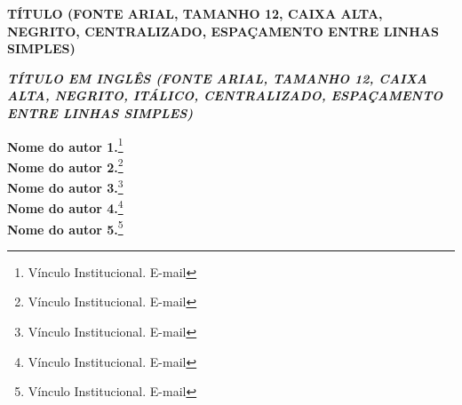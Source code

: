 \documentclass[12pt, a4paper]{article}
\begin{document}
\thispagestyle{firstpage} %
\vspace*{0.2cm}
\begin{center}
    \singlespacing
    \textbf{TÍTULO (FONTE ARIAL, TAMANHO 12, CAIXA ALTA, NEGRITO, CENTRALIZADO, ESPAÇAMENTO ENTRE LINHAS SIMPLES)}
\end{center}\vspace{-2.em}
\begin{center}
    \singlespacing
    \textit{\textbf{TÍTULO EM INGLÊS (FONTE ARIAL, TAMANHO 12, CAIXA ALTA, NEGRITO, ITÁLICO, CENTRALIZADO, ESPAÇAMENTO ENTRE LINHAS SIMPLES)}}
\end{center}\vspace{-2.em}
\begin{flushright}
    \singlespacing
    \textbf{Nome do autor 1.}\footnote{Vínculo Institucional. E-mail}\\
    \textbf{Nome do autor 2.}\footnote{Vínculo Institucional. E-mail}\\
    \textbf{Nome do autor 3.}\footnote{Vínculo Institucional. E-mail}\\
    \textbf{Nome do autor 4.}\footnote{Vínculo Institucional. E-mail}\\
    \textbf{Nome do autor 5.}\footnote{Vínculo Institucional. E-mail}
\end{flushright}\vspace{-.5em}
\end{document}
